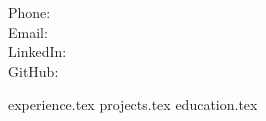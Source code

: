 \documentclass[letterpaper,11pt]{article}
\begin{document}
 {
    Phone:  \\ 
    Email:  \\
    LinkedIn:  \\
    GitHub: 
}

{experience.tex}
{projects.tex}
{education.tex}
\end{document}
